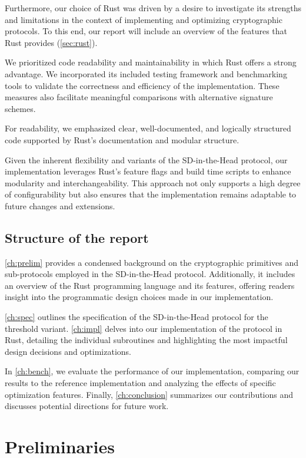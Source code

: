 \documentclass[11pt]{report}
\theoremstyle{definition}
\theoremstyle{plain}
\begin{document}
Furthermore, our choice of Rust was driven by a desire to investigate its strengths and limitations in the context of implementing and optimizing cryptographic protocols. To this end, our report will include an overview of the features that Rust provides (\autoref{sec:rust}).

We prioritized code readability and maintainability in which Rust offers a strong advantage. We incorporated its included testing framework and benchmarking tools to validate the correctness and efficiency of the implementation. These measures also facilitate meaningful comparisons with alternative signature schemes.

For readability, we emphasized clear, well-documented, and logically structured code supported by Rust's documentation and modular structure.

Given the inherent flexibility and variants of the SD-in-the-Head protocol, our implementation leverages Rust's feature flags and build time scripts to enhance modularity and interchangeability. This approach not only supports a high degree of configurability but also ensures that the implementation remains adaptable to future changes and extensions.

\section{Structure of the report}
\autoref{ch:prelim} provides a condensed background on the cryptographic primitives and sub-protocols employed in the SD-in-the-Head protocol. Additionally, it includes an overview of the Rust programming language and its features, offering readers insight into the programmatic design choices made in our implementation.

\autoref{ch:spec} outlines the specification of the SD-in-the-Head protocol for the threshold variant. \autoref{ch:impl} delves into our implementation of the protocol in Rust, detailing the individual subroutines and highlighting the most impactful design decisions and optimizations.

In \autoref{ch:bench}, we evaluate the performance of our implementation, comparing our results to the reference implementation and analyzing the effects of specific optimization features. Finally, \autoref{ch:conclusion} summarizes our contributions and discusses potential directions for future work.


\chapter{Preliminaries}\label{ch:prelim}
\end{document}
